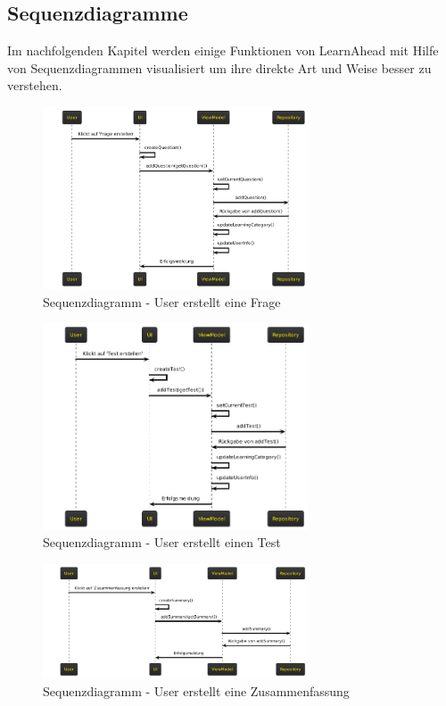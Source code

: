 \subsection{Sequenzdiagramme}
Im nachfolgenden Kapitel werden einige Funktionen von LearnAhead mit Hilfe von Sequenzdiagrammen visualisiert um ihre direkte Art und Weise besser zu verstehen.\\
\begin{figure}[H]
    \centering
    \includegraphics[width=0.7\textwidth]{images/diagramme/sequenzdiagramme/user_erstellt_frage.png}
    \caption{Sequenzdiagramm - User erstellt eine Frage}
    \label{fig:sequenz_user_erstellt_frage}
\end{figure} 
\begin{figure}[H]
    \centering
    \includegraphics[width=0.7\textwidth]{images/diagramme/sequenzdiagramme/user_erstellt_test.png}
    \caption{Sequenzdiagramm - User erstellt einen Test}
    \label{fig:sequenz_user_erstellt_test}
\end{figure} 
\begin{figure}[H]
    \centering
    \includegraphics[width=0.7\textwidth]{images/diagramme/sequenzdiagramme/user_erstellt_zusammenfassung.png}
    \caption{Sequenzdiagramm - User erstellt eine Zusammenfassung}
    \label{fig:sequenz_user_erstellt_zusammenfassung}
\end{figure} 

